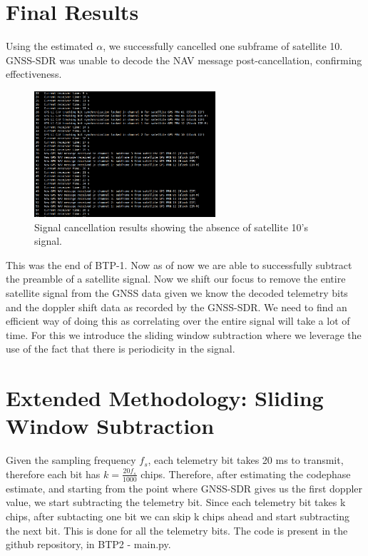 \documentclass[12pt]{report}
\begin{document}
\section{Final Results}
Using the estimated $\alpha$, we successfully cancelled one subframe of satellite 10. GNSS-SDR was unable to decode the NAV message post-cancellation, confirming effectiveness.
\begin{figure}[H]
    \centering
    \includegraphics[width=0.6\textwidth]{cancellation.png}
    \caption{Signal cancellation results showing the absence of satellite 10's signal.}
    \label{fig:cancellation}
\end{figure}

\noindent This was the end of BTP-1. Now as of now we are able to successfully subtract the preamble of a satellite signal. Now we shift our focus to remove the entire satellite signal from the GNSS data
given we know the decoded telemetry bits and the doppler shift data as recorded by the GNSS-SDR. We need to find an efficient way of doing this as correlating over the entire signal will take a lot of time. For this we introduce
the sliding window subtraction where we leverage the use of the fact that there is periodicity in the signal.
\section{Extended Methodology: Sliding Window Subtraction}
Given the sampling frequency $f_s$, each telemetry bit takes 20 ms to transmit, therefore each bit has $k = \frac{20f_s}{1000}$ chips. Therefore, after estimating the codephase estimate, and starting from the point where GNSS-SDR gives us the first doppler value, we start subtracting the telemetry bit.
Since each telemetry bit takes k chips, after subtacting one bit we can skip k chips ahead and start subtracting the next bit. This is done for all the telemetry bits. The code is present in the github repository, in BTP2 - main.py.
\end{document}
